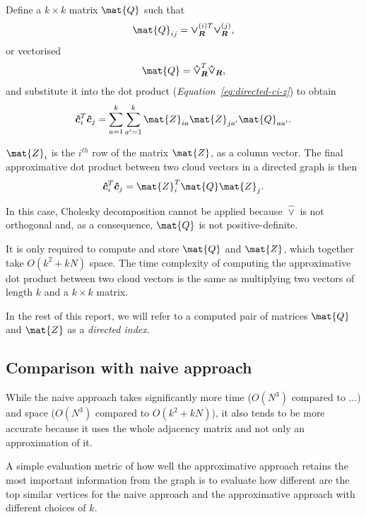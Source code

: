 \documentclass[12pt]{report}
\begin{document}
%
%

Define a $k \times k$ matrix $\mat{Q}$ such that
\begin{equation}
  \mat{Q}_{ij} = \bm{\vee_R}^{(i)T} \bm{\vee_R}^{(j)},
\end{equation}
or vectorised
\begin{equation}
  \mat{Q} = \bm{\hat{\vee}_R}^T \bm{\hat{\vee}_R},
\end{equation}
and substitute it into the dot product (\emph{Equation~\ref{eq:directed-ci-z}})
to obtain
\begin{equation}
  \bm{\hat{c}}_i^T \bm{\hat{c}}_j = \sum_{a=1}^k \sum_{a'=1}^k
    \mat{Z}_{ia} \mat{Z}_{ja'} \mat{Q}_{aa'}.
\end{equation}

$\mat{Z}_i$ is the $i^{th}$ row of the matrix $\mat{Z}$, as a column vector.
The final approximative dot product between two cloud vectors in a directed
graph is then
\begin{equation}
  \bm{\hat{c}}_i^T \bm{\hat{c}}_j = \mat{Z}_i^T \mat{Q} \mat{Z}_j.
\end{equation}

In this case, Cholesky decomposition cannot be applied because $\bm{\hat{\vee}}$
is not orthogonal and, as a consequence, $\mat{Q}$ is not positive-definite.

It is only required to compute and store $\mat{Q}$ and $\mat{Z}$, which together
take $O(k^2+kN)$ space. The time complexity of computing the approximative dot
product between two cloud vectors is the same as multiplying two vectors of
length $k$ and a $k \times k$ matrix.

In the rest of this report, we will refer to a computed pair of matrices
$\mat{Q}$ and $\mat{Z}$ as a \emph{directed index}.

%
%

\subsection{Comparison with naive approach}

While the naive approach takes significantly more time ($O(N^3)$ compared to
...) and space ($O(N^3)$ compared to $O(k^2 + kN)$), it also tends
to be more accurate because it uses the whole adjacency matrix and not only an
approximation of it.

A simple evaluation metric of how well the approximative approach retains the
most important information from the graph is to evaluate how different are the
top similar vertices for the naive approach and the approximative approach
with different choices of $k$.
\end{document}
